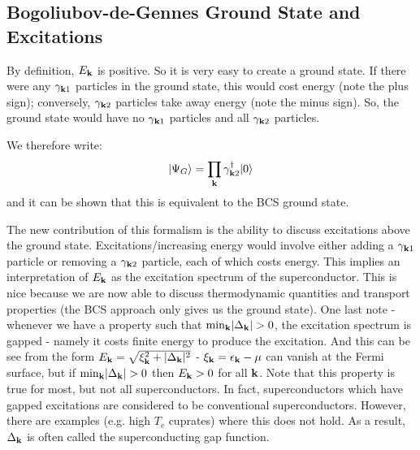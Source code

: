 \subsection{Bogoliubov-de-Gennes Ground State and Excitations}
By definition, $E_{\mathbf{k}}$ is positive. So it is very easy to create a ground state. If there were any $\gamma_{\mathbf{k}1}$ particles in the ground state, this would cost energy (note the plus sign); conversely, $\gamma_{\mathbf{k}2}$ particles take away energy (note the minus sign). So, the ground state would have no $\gamma_{\mathbf{k}1}$ particles and all $\gamma_{\mathbf{k}2}$ particles.

We therefore write:
\begin{equation}
    \lvert \Psi_G \rangle = \prod_{\mathbf{k}}\gamma^\dagger_{\mathbf{k}2}\lvert 0 \rangle
\end{equation}
and it can be shown that this is equivalent to the BCS ground state. 

The new contribution of this formalism is the ability to discuss excitations above the ground state. Excitations/increasing energy would involve either adding a $\gamma_{\mathbf{k}1}$ particle or removing a $\gamma_{\mathbf{k}2}$ particle, each of which costs energy. This implies an interpretation of $E_{\mathbf{k}}$ as the excitation spectrum of the superconductor. This is nice because we are now able to discuss thermodynamic quantities and transport properties (the BCS approach only gives us the ground state). One last note - whenever we have a property such that $\min_{\mathbf{k}}\lvert \Delta_{\mathbf{k}} \rvert > 0$, the excitation spectrum is gapped - namely it costs finite energy to produce the excitation. And this can be see from the form $E_{\mathbf{k}} = \sqrt{\xi_{\mathbf{k}}^2 + \lvert \Delta_{\mathbf{k}} \rvert^2}$ - $\xi_{\mathbf{k}} = \epsilon_{\mathbf{k}} - \mu$ can vanish at the Fermi surface, but if $\min_{\mathbf{k}}\lvert \Delta_{\mathbf{k}} \rvert > 0$ then $E_{\mathbf{k}} > 0$ for all $\mathbf{k}$. Note that this property is true for most, but not all superconductors. In fact, superconductors which have gapped excitations are considered to be conventional superconductors. However, there are examples (e.g. high $T_c$ cuprates) where this does not hold. As a result, $\Delta_{\mathbf{k}}$ is often called the superconducting gap function. 

